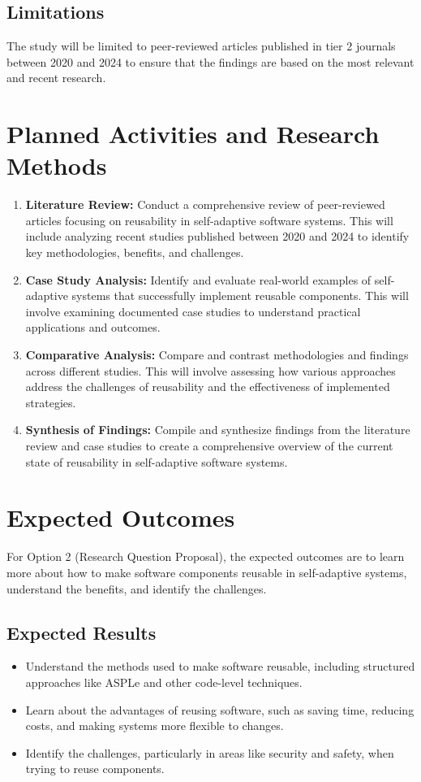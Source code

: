 \documentclass[a4paper, 12pt]{article}
\begin{document}
\subsection*{Limitations}
The study will be limited to peer-reviewed articles published in tier 2 journals between 2020 and 2024 to ensure that the findings are based on the most relevant and recent research.

\section{Planned Activities and Research Methods}
\begin{enumerate}
    \item \textbf{Literature Review:} Conduct a comprehensive review of peer-reviewed articles focusing on reusability in self-adaptive software systems. This will include analyzing recent studies published between 2020 and 2024 to identify key methodologies, benefits, and challenges.
    \item \textbf{Case Study Analysis:} Identify and evaluate real-world examples of self-adaptive systems that successfully implement reusable components. This will involve examining documented case studies to understand practical applications and outcomes.
    \item \textbf{Comparative Analysis:} Compare and contrast methodologies and findings across different studies. This will involve assessing how various approaches address the challenges of reusability and the effectiveness of implemented strategies.
    \item \textbf{Synthesis of Findings:} Compile and synthesize findings from the literature review and case studies to create a comprehensive overview of the current state of reusability in self-adaptive software systems.
\end{enumerate}

\section{Expected Outcomes}
For Option 2 (Research Question Proposal), the expected outcomes are to learn more about how to make software components reusable in self-adaptive systems, understand the benefits, and identify the challenges.

\subsection*{Expected Results}
\begin{itemize}
    \item Understand the methods used to make software reusable, including structured approaches like ASPLe and other code-level techniques.
    \item Learn about the advantages of reusing software, such as saving time, reducing costs, and making systems more flexible to changes.
    \item Identify the challenges, particularly in areas like security and safety, when trying to reuse components.
\end{itemize}
\end{document}
